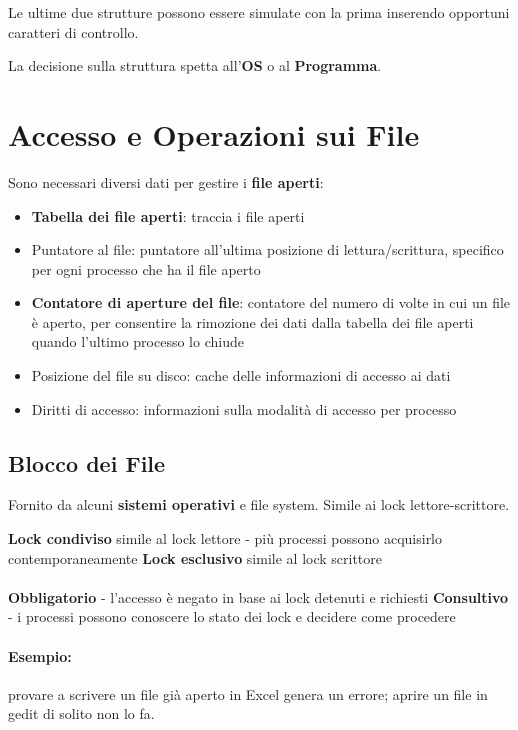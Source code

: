 Le ultime due strutture possono essere simulate con la prima inserendo opportuni caratteri di controllo.

La decisione sulla struttura spetta all'\textbf{OS} o al \textbf{Programma}.

\section{Accesso e Operazioni sui File}

Sono necessari diversi dati per gestire i \textbf{file aperti}:

\begin{itemize}
  \item \textbf{Tabella dei file aperti}: traccia i file aperti
  \item Puntatore al file: puntatore all'ultima posizione di lettura/scrittura, specifico per ogni processo che ha il file aperto
  \item \textbf{Contatore di aperture del file}: contatore del numero di volte in cui un file è aperto, per consentire la rimozione dei dati dalla tabella dei file aperti quando l'ultimo processo lo chiude
  \item Posizione del file su disco: cache delle informazioni di accesso ai dati
  \item Diritti di accesso: informazioni sulla modalità di accesso per processo
\end{itemize}

\subsection{Blocco dei File}
Fornito da alcuni \textbf{sistemi operativi} e file system. Simile ai lock lettore-scrittore.

\textbf{Lock condiviso} simile al lock lettore - più processi possono acquisirlo contemporaneamente
\textbf{Lock esclusivo} simile al lock scrittore

\paragraph{}

\textbf{Obbligatorio} - l'accesso è negato in base ai lock detenuti e richiesti
\textbf{Consultivo} - i processi possono conoscere lo stato dei lock e decidere come procedere

\paragraph{Esempio: } provare a scrivere un file già aperto in Excel genera un errore; aprire un file in gedit di solito non lo fa.

